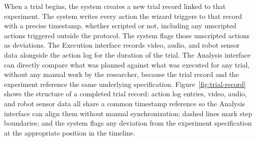 When a trial begins, the system creates a new trial record linked to that experiment. The system writes every action the wizard triggers to that record with a precise timestamp, whether scripted or not, including any unscripted actions triggered outside the protocol. The system flags those unscripted actions as deviations. The Execution interface records video, audio, and robot sensor data alongside the action log for the duration of the trial. The Analysis interface can directly compare what was planned against what was executed for any trial, without any manual work by the researcher, because the trial record and the experiment reference the same underlying specification. Figure~\ref{fig:trial-record} shows the structure of a completed trial record: action log entries, video, audio, and robot sensor data all share a common timestamp reference so the Analysis interface can align them without manual synchronization; dashed lines mark step boundaries; and the system flags any deviation from the experiment specification at the appropriate position in the timeline.

